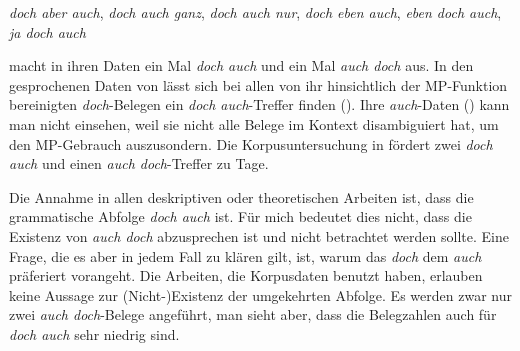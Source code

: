 \begin{exe}
	\ex\label{835}
	\textit{doch aber auch}, \textit{doch auch ganz}, \textit{doch auch nur}, \textit{doch eben auch}, \textit{eben doch auch}, \textit{ja doch auch}
\end{exe}					
\citet[254]{Hentschel1986} macht in ihren Daten ein Mal \textit{doch auch} und ein Mal \textit{auch doch} aus. In den gesprochenen Daten von \citet{Moellering2004} lässt sich bei allen von ihr hinsichtlich der MP-Funktion bereinigten \textit{doch}-Belegen ein \textit{doch auch}-Treffer finden (\citeyear[256]{Moellering2004}). Ihre \textit{auch}-Daten (\citeyear[450]{Moellering2004}) kann man nicht einsehen, weil sie nicht alle Belege im Kontext disambiguiert hat, um den MP-Gebrauch auszusondern. Die Korpusuntersuchung in \citet{Braber2010} fördert zwei \textit{doch auch} und einen \textit{auch doch}-Treffer zu Tage.

Die Annahme in allen deskriptiven oder theoretischen Arbeiten ist, dass die grammatische Abfolge \textit{doch auch} ist. Für mich bedeutet dies nicht, dass die E\-xistenz von \textit{auch doch} abzusprechen ist und nicht betrachtet werden sollte. Eine Frage, die es aber in jedem Fall zu klären gilt, ist, warum das \textit{doch} dem \textit{auch} präferiert vorangeht. Die Arbeiten, die Korpusdaten benutzt haben, erlauben keine Aussage zur (Nicht-)Existenz der umgekehrten Abfolge. Es werden zwar nur zwei \textit{auch doch}-Belege angeführt, man sieht aber, dass die Belegzahlen auch für \textit{doch auch} sehr niedrig sind.

